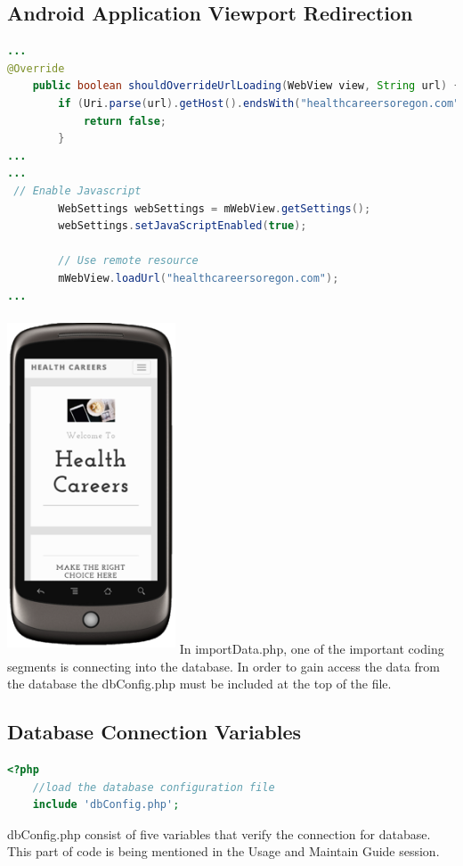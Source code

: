 \documentclass[onecolumn, draftclsnofoot,10pt, compsoc]{IEEEtran}
\begin{document}
\subsection{Android Application Viewport Redirection}
\begin{lstlisting}[language=java]
...
@Override
    public boolean shouldOverrideUrlLoading(WebView view, String url) {
        if (Uri.parse(url).getHost().endsWith("healthcareersoregon.com")) {
            return false;
        }
...
...
 // Enable Javascript
        WebSettings webSettings = mWebView.getSettings();
        webSettings.setJavaScriptEnabled(true);

        // Use remote resource
        mWebView.loadUrl("healthcareersoregon.com");
...
\end{lstlisting}
\includegraphics[width=5cm, height=10cm]{phone.png}
\newpage
\noindent In importData.php, one of the important coding segments is connecting into the database. In order to gain access the data from the database the dbConfig.php must be included at the top of the file. 
\subsection{Database Connection Variables}
\begin{lstlisting}[language=PHP]
<?php
	//load the database configuration file
	include 'dbConfig.php';
\end{lstlisting}

\noindent dbConfig.php consist of five variables that verify the connection for database. This part of code is being mentioned in the Usage and Maintain Guide session. 
\end{document}
